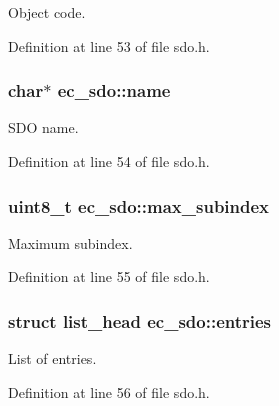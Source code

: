 Object code. 



Definition at line 53 of file sdo.\-h.

\subsubsection[{name}]{\setlength{\rightskip}{0pt plus 5cm}char$\ast$ ec\-\_\-sdo\-::name}\label{structec__sdo_a4dae1d2cd41ce8ab4407097ed7844472}


S\-D\-O name. 



Definition at line 54 of file sdo.\-h.

\subsubsection[{max\-\_\-subindex}]{\setlength{\rightskip}{0pt plus 5cm}uint8\-\_\-t ec\-\_\-sdo\-::max\-\_\-subindex}\label{structec__sdo_ad493bab8f7ef1179d41172bbc445c77e}


Maximum subindex. 



Definition at line 55 of file sdo.\-h.

\subsubsection[{entries}]{\setlength{\rightskip}{0pt plus 5cm}struct list\-\_\-head ec\-\_\-sdo\-::entries}\label{structec__sdo_a9f7c6b8967a84ba8686f1eb851019b4f}


List of entries. 



Definition at line 56 of file sdo.\-h.

